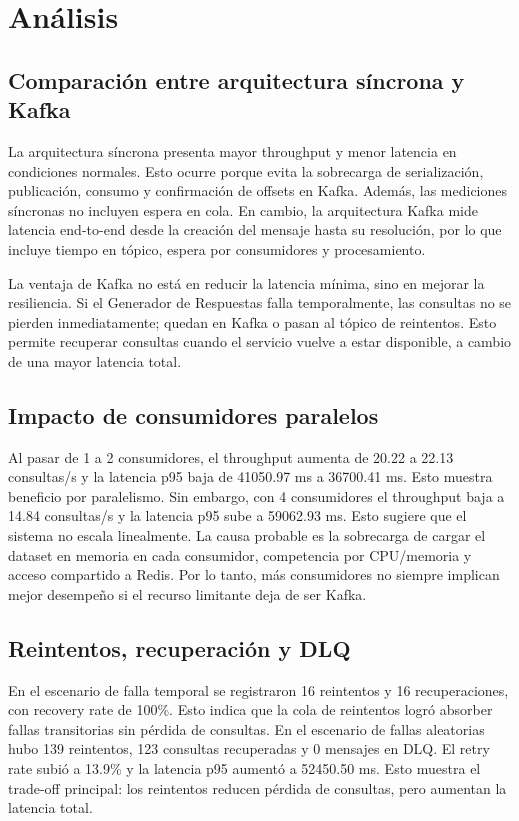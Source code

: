 \documentclass[11pt,letterpaper]{article}
\begin{document}
\section{Análisis}

\subsection{Comparación entre arquitectura síncrona y Kafka}

La arquitectura síncrona presenta mayor throughput y menor latencia en condiciones normales. Esto ocurre porque evita la sobrecarga de serialización, publicación, consumo y confirmación de offsets en Kafka. Además, las mediciones síncronas no incluyen espera en cola. En cambio, la arquitectura Kafka mide latencia end-to-end desde la creación del mensaje hasta su resolución, por lo que incluye tiempo en tópico, espera por consumidores y procesamiento.

La ventaja de Kafka no está en reducir la latencia mínima, sino en mejorar la resiliencia. Si el Generador de Respuestas falla temporalmente, las consultas no se pierden inmediatamente; quedan en Kafka o pasan al tópico de reintentos. Esto permite recuperar consultas cuando el servicio vuelve a estar disponible, a cambio de una mayor latencia total.

\subsection{Impacto de consumidores paralelos}

Al pasar de 1 a 2 consumidores, el throughput aumenta de 20.22 a 22.13 consultas/s y la latencia p95 baja de 41050.97 ms a 36700.41 ms. Esto muestra beneficio por paralelismo. Sin embargo, con 4 consumidores el throughput baja a 14.84 consultas/s y la latencia p95 sube a 59062.93 ms. Esto sugiere que el sistema no escala linealmente. La causa probable es la sobrecarga de cargar el dataset en memoria en cada consumidor, competencia por CPU/memoria y acceso compartido a Redis. Por lo tanto, más consumidores no siempre implican mejor desempeño si el recurso limitante deja de ser Kafka.

\subsection{Reintentos, recuperación y DLQ}

En el escenario de falla temporal se registraron 16 reintentos y 16 recuperaciones, con recovery rate de 100\%. Esto indica que la cola de reintentos logró absorber fallas transitorias sin pérdida de consultas. En el escenario de fallas aleatorias hubo 139 reintentos, 123 consultas recuperadas y 0 mensajes en DLQ. El retry rate subió a 13.9\% y la latencia p95 aumentó a 52450.50 ms. Esto muestra el trade-off principal: los reintentos reducen pérdida de consultas, pero aumentan la latencia total.
\end{document}
